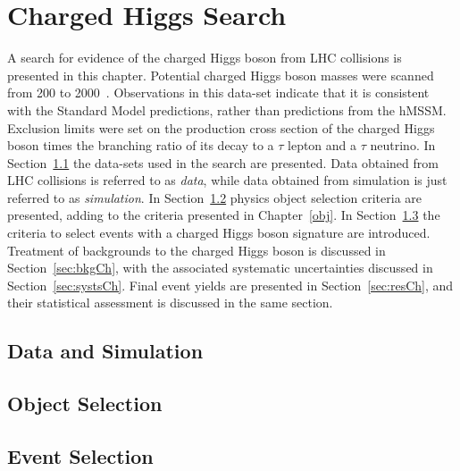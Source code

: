 \chapter{Charged Higgs Search}
\label{chargedH}
\begin{chapabstract}
A search for evidence of the charged Higgs boson from LHC collisions is 
presented in this chapter. Potential charged Higgs boson masses were scanned from 200 
to 2000~\GeV. Observations in this data-set indicate that it is consistent with the Standard 
Model predictions, rather than predictions from the hMSSM. Exclusion limits were 
set on the production cross section of the charged 
Higgs boson times the branching ratio of its decay to a $\tau$ lepton and a $\tau$ neutrino.  
In Section~\ref{sec:samplesCh} the data-sets used in the search are presented. Data obtained from 
LHC collisions is referred to as {\it data}, while data obtained from simulation is just referred to 
as {\it simulation}. In Section~\ref{sec:objCh} physics object selection criteria are presented, adding to the 
 criteria presented in Chapter~\ref{obj}. In Section~\ref{sec:evSelCh} the 
criteria to select events with a charged Higgs boson 
signature are introduced. Treatment of backgrounds to the charged Higgs boson is discussed in 
Section~\ref{sec:bkgCh}, with the associated systematic uncertainties discussed in Section~\ref{sec:systsCh}. 
Final event yields are presented in Section~\ref{sec:resCh}, and their statistical assessment is 
discussed in the same section.
\end{chapabstract}

\section{Data and Simulation}
\label{sec:samplesCh}


\section{Object Selection}
\label{sec:objCh}


\section{Event Selection}
\label{sec:evSelCh}



